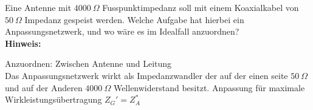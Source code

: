 \begin{question}[section=11,name={Anpassungsnetzwerk},difficulty=,quantity=1,type=thr,tags={}]
	Eine Antenne mit $4000 ~\Omega$  Fusspunktimpedanz soll mit einem Koaxialkabel von $50 ~\Omega$ Impedanz gespeist werden. Welche Aufgabe hat hierbei ein Anpassungsnetzwerk, und wo wäre es im Idealfall anzuordnen?
	\\ \textbf{Hinweis:}\\
	
\end{question}
\begin{solution}
	Anzuordnen: Zwischen Antenne und Leitung\\
	Das Anpassungsnetzwerk wirkt als Impedanzwandler der auf der einen seite $50~\Omega$ und auf der Anderen $4000~\Omega$ Wellenwiderstand besitzt. Anpassung für maximale Wirkleistungsübertragung $Z_G' =Z_A^*$
	
\end{solution}